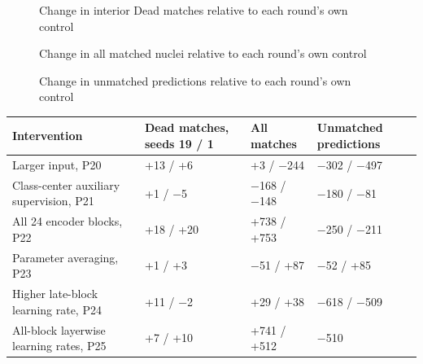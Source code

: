 \documentclass[
  11pt,
]{article}
\newcounter{none} %
\begin{document}
\begin{figure}[H]\centering

\caption{Change in interior Dead matches relative to each round's own control}
\end{figure}

\begin{figure}[H]\centering

\caption{Change in all matched nuclei relative to each round's own control}
\end{figure}

\begin{figure}[H]\centering

\caption{Change in unmatched predictions relative to each round's own control}
\end{figure}

{\def\LTcaptype{none} %
\begin{longtable}[]{@{}
  >{\raggedright\arraybackslash}p{}
  >{\raggedleft\arraybackslash}p{}
  >{\raggedleft\arraybackslash}p{}
  >{\raggedleft\arraybackslash}p{}@{}}
\toprule\noalign{}
\begin{minipage}[b]{\linewidth}\raggedright
Intervention
\end{minipage} & \begin{minipage}[b]{\linewidth}\raggedleft
Dead matches, seeds 19 / 1
\end{minipage} & \begin{minipage}[b]{\linewidth}\raggedleft
All matches
\end{minipage} & \begin{minipage}[b]{\linewidth}\raggedleft
Unmatched predictions
\end{minipage} \\
\midrule\noalign{}
\endhead
\bottomrule\noalign{}
\endlastfoot
Larger input, P20 & +13 / +6 & +3 / −244 & −302 / −497 \\
Class-center auxiliary supervision, P21 & +1 / −5 & −168 / −148 & −180 /
−81 \\
All 24 encoder blocks, P22 & +18 / +20 & +738 / +753 & −250 / −211 \\
Parameter averaging, P23 & +1 / +3 & −51 / +87 & −52 / +85 \\
Higher late-block learning rate, P24 & +11 / −2 & +29 / +38 & −618 /
−509 \\
All-block layerwise learning rates, P25 & +7 / +10 & +741 / +512 & −510

\end{longtable}}
\end{document}

